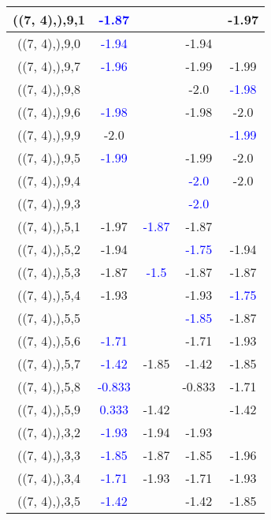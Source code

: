 \documentclass{article}
\begin{document}
\begin{center}
\begin{longtable}{|c|c|c|c|c|}
        	\hline
        	((7, 4),),9,1& \textcolor{blue}{-1.87}&&&-1.97\\
        	\hline
        	((7, 4),),9,0& \textcolor{blue}{-1.94}&&-1.94&\\
        	\hline
        	((7, 4),),9,7& \textcolor{blue}{-1.96}&&-1.99&-1.99\\
        	\hline
        	((7, 4),),9,8&&&-2.0& \textcolor{blue}{-1.98}\\
        	\hline
        	((7, 4),),9,6& \textcolor{blue}{-1.98}&&-1.98&-2.0\\
        	\hline
        	((7, 4),),9,9&-2.0&&& \textcolor{blue}{-1.99}\\
        	\hline
        	((7, 4),),9,5& \textcolor{blue}{-1.99}&&-1.99&-2.0\\
        	\hline
        	((7, 4),),9,4&&& \textcolor{blue}{-2.0}&-2.0\\
        	\hline
        	((7, 4),),9,3&&& \textcolor{blue}{-2.0}&\\
        	\hline
        	((7, 4),),5,1&-1.97& \textcolor{blue}{-1.87}&-1.87&\\
        	\hline
        	((7, 4),),5,2&-1.94&& \textcolor{blue}{-1.75}&-1.94\\
        	\hline
        	((7, 4),),5,3&-1.87& \textcolor{blue}{-1.5}&-1.87&-1.87\\
        	\hline
        	((7, 4),),5,4&-1.93&&-1.93& \textcolor{blue}{-1.75}\\
        	\hline
        	((7, 4),),5,5&&& \textcolor{blue}{-1.85}&-1.87\\
        	\hline
        	((7, 4),),5,6& \textcolor{blue}{-1.71}&&-1.71&-1.93\\
        	\hline
        	((7, 4),),5,7& \textcolor{blue}{-1.42}&-1.85&-1.42&-1.85\\
        	\hline
        	((7, 4),),5,8& \textcolor{blue}{-0.833}&&-0.833&-1.71\\
        	\hline
        	((7, 4),),5,9& \textcolor{blue}{0.333}&-1.42&&-1.42\\
        	\hline
        	((7, 4),),3,2& \textcolor{blue}{-1.93}&-1.94&-1.93&\\
        	\hline
        	((7, 4),),3,3& \textcolor{blue}{-1.85}&-1.87&-1.85&-1.96\\
        	\hline
        	((7, 4),),3,4& \textcolor{blue}{-1.71}&-1.93&-1.71&-1.93\\
        	\hline
        	((7, 4),),3,5& \textcolor{blue}{-1.42}&&-1.42&-1.85\\
        	\hline

\end{longtable}
\end{center}
\end{document}
